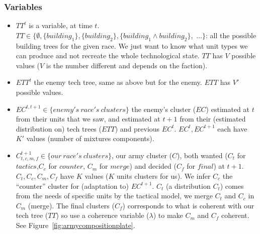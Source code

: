 \subsubsection{Variables}
\begin{itemize}
    \item $TT^t$ is a  variable, at time $t$. $TT \in \{\emptyset, \{building_1\}, \{building_2\}, \{building_1\wedge building_2\},$ $\dots\}$: all the possible building trees for the given race. %
We just want to know what unit types we can produce and not recreate the whole technological state. %
$TT$ has $V$ possible values ($V$ is the number different  and depends on the faction).

    \item $ETT^t$ the enemy tech tree, same as above but for the enemy. $ETT$ has $V'$ possible values.

    \item $EC^{t,t+1} \in \{enemy's\ race's\ clusters\}$ the enemy's cluster ($EC$) estimated at $t$ from their units that we saw, and estimated at $t+1$ from their (estimated distribution on) tech trees ($ETT$) and previous $EC^t$. $EC^t, EC^{t+1}$ each have $K'$ values (number of mixtures components).

    \item $C_{t,c,m,f}^{t+1} \in \{our\ race's\ clusters\}$, our army cluster ($C$), both wanted ($C_{t}$ for $tactics$,$C_{c}$ for $counter$, $C_{m}$ for $merge$) and decided ($C_{f}$ for $final$) at $t+1$. $C_{t},C_{c},C_{m},C_{f}$ have $K$ values ($K$ units clusters for us). 
We infer $C_c$ the ``counter'' cluster for (adaptation to) $EC^{t+1}$. $C_t$ (a distribution $C_t$) comes from the needs of specific units by the tactical model, we merge $C_t$ and $C_c$ in $C_m$ (merge). The final clusters ($C_f$) corresponds to what is coherent with our tech tree ($TT$) so use a coherence variable ($\lambda$) to make $C_m$ and $C_f$ coherent. See Figure~\ref{fig:armycompositionplate}.


\end{itemize}
